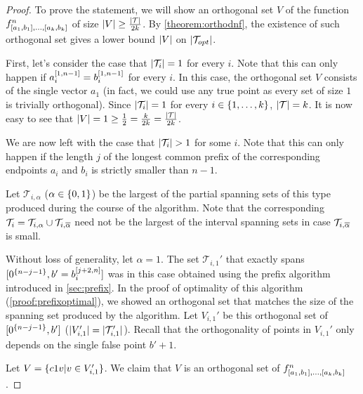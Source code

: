\begin{proof}
To prove the statement,
we will show an orthogonal set $V$ of the function
$f^n_{[a_1, b_1], \ldots, [a_k, b_k]}$
of size
$\lvert V\rvert \geq \frac{\lvert\mathcal{T}\rvert}{2k}$.
By \autoref{theorem:orthodnf},
the existence of such orthogonal set
gives a lower bound $\lvert V\rvert$
on $\lvert\mathcal{T}_{opt}\rvert$.

First, let's consider the case that
$\lvert\mathcal{T}_i\rvert = 1$ for every $i$.
Note that this can only happen if
$a_i^{[1, n-1]} = b_i^{[1, n-1]}$ for every $i$.
In this case,
the orthogonal set $V$ consists of the single vector $a_1$
(in fact, we could use any true point
as every set of size $1$ is trivially orthogonal).
Since $\lvert\mathcal{T}_i\rvert = 1$
for every $i \in \{1, \ldots, k\}$,
$\lvert\mathcal{T}\rvert = k$.
It is now easy to see that
$\lvert V\rvert = 1
\geq \frac{1}{2} = \frac{k}{2k} =
\frac{\lvert\mathcal{T}\rvert}{2k}$.

We are now left with the case that
$\lvert\mathcal{T}_i\rvert > 1$ for some $i$.
Note that this can only happen if
the length $j$
of the longest common prefix
of the corresponding endpoints $a_i$ and $b_i$
is strictly smaller than $n-1$.

Let $\mathcal{T}_{i, \alpha}$
($\alpha \in \{0, 1\}$)
be the largest
of the partial spanning sets of this type
produced during the course of the algorithm.
Note that the corresponding
$\mathcal{T}_i
= \mathcal{T}_{i, \alpha}
\cup \mathcal{T}_{i, \overline{\alpha}}$
need not be the largest of the interval spanning sets
in case
$\mathcal{T}_{i, \overline{\alpha}}$ is small.

Without loss of generality,
let $\alpha = 1$.
The set $\mathcal{T}_{i, 1}'$
that exactly spans
$[0^{\{n-j-1\}}, b' = b_i^{[j+2, n]}]$
was in this case obtained
using the prefix algorithm
introduced in \autoref{sec:prefix}.
In the proof of optimality of this algorithm
(\autoref{proof:prefixoptimal}),
we showed an orthogonal set that matches the size
of the spanning set produced by the algorithm.
Let $V_{i, 1}'$ be this orthogonal set
of $[0^{\{n-j-1\}}, b']$
($\lvert V_{i, 1}'\rvert
= \lvert\mathcal{T}_{i, 1}'\rvert$).
Recall that the orthogonality of points in $V_{i, 1}'$
only depends on the single false point $b' + 1$.

Let $V = \{c 1 v | v \in V_{i, 1}'\}$.
We claim that $V$ is an orthogonal set of
$f^n_{[a_1, b_1], \ldots, [a_k, b_k]}$.


\end{proof}

